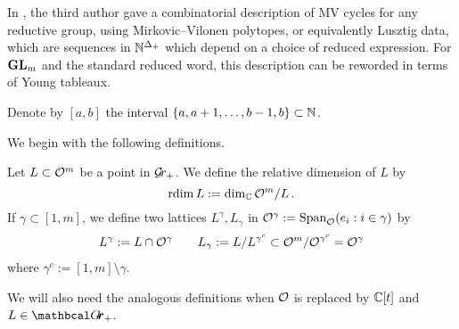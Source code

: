 \documentclass{article} %
\begin{document}
In \cite{kamnitzer2010mirkovic}, the third author gave a combinatorial description of MV cycles for any reductive group, using Mirkovic--Vilonen polytopes, or equivalently Lusztig data, which are sequences in $\mathbb N^{\Delta_+}$ which depend on a choice of reduced expression.  For ${\mathbf{GL}}_m$ and the standard reduced word, this description can be reworded in terms of Young tableaux. 


Denote by $[a,b]$ the interval $\{a,a+1,\dots,b-1,b\}\subset\mathbb N$. 

We begin with the following definitions.
\begin{definition}
Let $ L \subset \mathcal O^m$ be a point in $ \mathcal{G}\!r_+$.  We define the relative dimension of $L $ by
$$
\operatorname{rdim} L := \dim_\mathbb C \mathcal O^m/L\,. 
$$
% 
If $ \gamma \subset [1,m]$, we define two lattices $ L^\gamma, L_\gamma $ in $ \mathcal O^\gamma := \operatorname{Span}_{\mathcal O}(e_i : i \in \gamma) $ by
\begin{gather*}
L^\gamma:= L \cap \mathcal O^\gamma  \qquad L_\gamma := L / L^{\gamma^c} \subset \mathcal O^m / \mathcal O^{\gamma^c} = \mathcal O^\gamma
\end{gather*}
where $ \gamma^c := [1,m] \setminus \gamma$.
% 
\end{definition}
We will also need the analogous definitions when $ \mathcal O$ is replaced by $ \mathbb C[t]$ and $L \in \Grth_+$.
\end{document}
